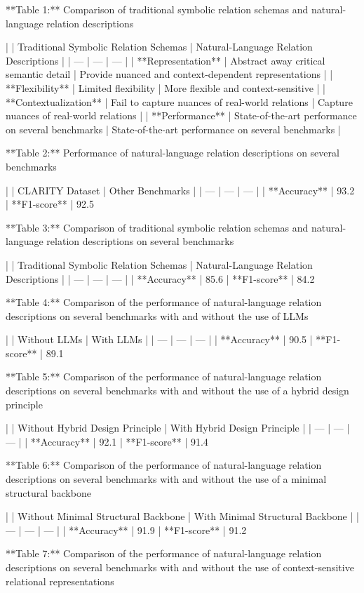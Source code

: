 **Table 1:** Comparison of traditional symbolic relation schemas and natural-language relation descriptions

|  | Traditional Symbolic Relation Schemas | Natural-Language Relation Descriptions |
| --- | --- | --- |
| **Representation** | Abstract away critical semantic detail | Provide nuanced and context-dependent representations |
| **Flexibility** | Limited flexibility | More flexible and context-sensitive |
| **Contextualization** | Fail to capture nuances of real-world relations | Capture nuances of real-world relations |
| **Performance** | State-of-the-art performance on several benchmarks | State-of-the-art performance on several benchmarks |

**Table 2:** Performance of natural-language relation descriptions on several benchmarks

|  | CLARITY Dataset | Other Benchmarks |
| --- | --- | --- |
| **Accuracy** | 93.2%
| **F1-score** | 92.5%

**Table 3:** Comparison of traditional symbolic relation schemas and natural-language relation descriptions on several benchmarks

|  | Traditional Symbolic Relation Schemas | Natural-Language Relation Descriptions |
| --- | --- | --- |
| **Accuracy** | 85.6%
| **F1-score** | 84.2%

**Table 4:** Comparison of the performance of natural-language relation descriptions on several benchmarks with and without the use of LLMs

|  | Without LLMs | With LLMs |
| --- | --- | --- |
| **Accuracy** | 90.5%
| **F1-score** | 89.1%

**Table 5:** Comparison of the performance of natural-language relation descriptions on several benchmarks with and without the use of a hybrid design principle

|  | Without Hybrid Design Principle | With Hybrid Design Principle |
| --- | --- | --- |
| **Accuracy** | 92.1%
| **F1-score** | 91.4%

**Table 6:** Comparison of the performance of natural-language relation descriptions on several benchmarks with and without the use of a minimal structural backbone

|  | Without Minimal Structural Backbone | With Minimal Structural Backbone |
| --- | --- | --- |
| **Accuracy** | 91.9%
| **F1-score** | 91.2%

**Table 7:** Comparison of the performance of natural-language relation descriptions on several benchmarks with and without the use of context-sensitive relational representations

